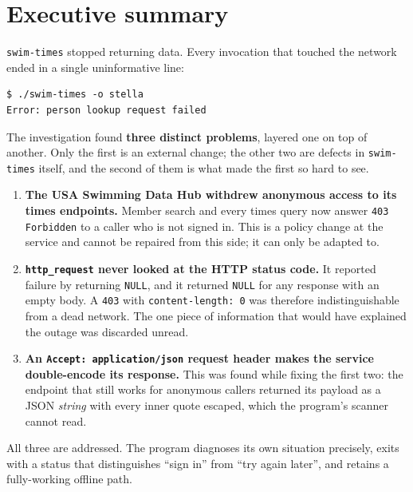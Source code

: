 \documentclass[11pt]{article}
\newcommand{\code}[1]{\texttt{#1}}
\begin{document}
\tableofcontents
\clearpage

\section{Executive summary}

\code{swim-times} stopped returning data.  Every invocation that
touched the network ended in a single uninformative line:

\begin{lstlisting}
$ ./swim-times -o stella
Error: person lookup request failed
\end{lstlisting}

\noindent The investigation found \textbf{three distinct problems},
layered one on top of another.  Only the first is an external change;
the other two are defects in \code{swim-times} itself, and the second
of them is what made the first so hard to see.

\begin{enumerate}[leftmargin=*]
\item \textbf{The USA Swimming Data Hub withdrew anonymous access to
      its times endpoints.}  Member search and every times query now
      answer \code{403 Forbidden} to a caller who is not signed in.
      This is a policy change at the service and cannot be repaired
      from this side; it can only be adapted to.
\item \textbf{\code{http\_request} never looked at the HTTP status
      code.}  It reported failure by returning \code{NULL}, and it
      returned \code{NULL} for any response with an empty body.  A
      \code{403} with \code{content-length:\,0} was therefore
      indistinguishable from a dead network.  The one piece of
      information that would have explained the outage was discarded
      unread.
\item \textbf{An \code{Accept:\ application/json} request header makes
      the service double-encode its response.}  This was found while
      fixing the first two: the endpoint that still works for anonymous
      callers returned its payload as a JSON \emph{string} with every
      inner quote escaped, which the program's scanner cannot read.
\end{enumerate}

\noindent All three are addressed.  The program diagnoses its own
situation precisely, exits with a status that distinguishes ``sign in''
from ``try again later'', and retains a fully-working offline path.
\end{document}
